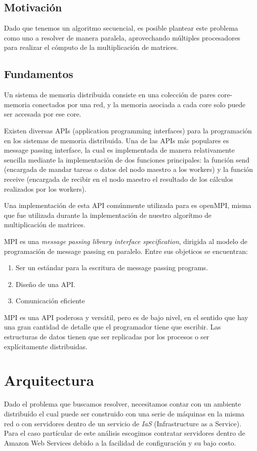 \documentclass[DIV=calc, paper=letter, fontsize=11pt, twocolumn]{scrartcl}
\begin{document}
\subsection{Motivación}

Dado que tenemos un algoritmo secuencial, es posible plantear este problema como uno a resolver de manera paralela, aprovechando múltiples procesadores para realizar el cómputo de la multiplicación de matrices.

\subsection{Fundamentos}

Un sistema de memoria distribuida consiste en una colección de pares core-memoria conectados por una red, y la memoria asociada a cada core solo puede ser accesada por ese core.

Existen diversas APIs (application programming interfaces) para la programación en los sistemas de memoria distribuida. Una de las APIs más populares es message passing interface, la cual es implementada de manera relativamente sencilla mediante la implementación de dos funciones principales: la función send (encargada de mandar tareas o datos del nodo maestro a los workers) y la función receive (encargada de recibir en el nodo maestro el resultado de los cálculos realizados por los workers).

Una implementación de esta API comúnmente utilizada para es openMPI, misma que fue utilizada durante la implementación de nuestro algorítmo de multiplicación de matrices.

MPI es una \textit{message passing library interface specification}, dirigida al modelo de programación de message passing en paralelo. Entre sus objeticos se encuentran:

\begin{enumerate}
    \item Ser un estándar para la escritura de message passing programs.
    \item Diseño de una API.
    \item Comunicación eficiente
\end{enumerate}

MPI es una API poderosa y versátil, pero es de bajo nivel, en el sentido que hay una gran cantidad de detalle que el programador tiene que escribir. Las estructuras de datos tienen que ser replicadas por los procesos o ser explícitamente distribuidas.

\section{Arquitectura}
Dado el problema que buscamos resolver, necesitamos contar con un ambiente distribuído el cual puede ser construido con una serie de máquinas en la misma red o con servidores dentro de un servicio de \textit{IaS} (Infrastructure as a Service). Para el caso partícular de este análisis escogimos contratar servidores dentro de Amazon Web Services debido a la facilidad de configuración y su bajo costo.
\end{document}
